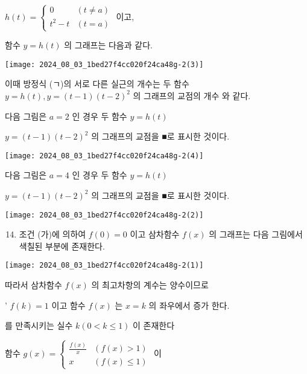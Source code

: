 \documentclass[10pt]{article}
\begin{document}
\(h(t)=\left\{\begin{array}{ll}0 & (t \neq a) \\ t^{2}-t & (t=a)\end{array}\right.\) 이고,

함수 \(y=h(t)\) 의 그래프는 다음과 같다.

\begin{center}
\texttt{[image: 2024\_08\_03\_1bed27f4cc020f24ca48g-2(3)]}
\end{center}

이때 방정식 (ㄱ)의 서로 다른 실근의 개수는 두 함수 \(y=h(t), y=(t-1)(t-2)^{2}\) 의 그래프의 교점의 개수 와 같다.

다음 그림은 \(a=2\) 인 경우 두 함수 \(y=h(t)\)

\(y=(t-1)(t-2)^{2}\) 의 그래프의 교점을 ■로 표시한 것이다.

\begin{center}
\texttt{[image: 2024\_08\_03\_1bed27f4cc020f24ca48g-2(4)]}
\end{center}

다음 그림은 \(a=4\) 인 경우 두 함수 \(y=h(t)\)

\(y=(t-1)(t-2)^{2}\) 의 그래프의 교점을 ■로 표시한 것이다.

\begin{center}
\texttt{[image: 2024\_08\_03\_1bed27f4cc020f24ca48g-2(2)]}
\end{center}

\begin{enumerate}
  \setcounter{enumi}{13}
  \item 조건 (가)에 의하여 \(f(0)=0\) 이고 삼차함수 \(f(x)\) 의 그래프는 다음 그림에서 색칠된 부분에 존재한다.
\end{enumerate}

\begin{center}
\texttt{[image: 2024\_08\_03\_1bed27f4cc020f24ca48g-2(1)]}
\end{center}

따라서 삼차함수 \(f(x)\) 의 최고차항의 계수는 양수이므로

' \(f(k)=1\) 이고 함수 \(f(x)\) 는 \(x=k\) 의 좌우에서 증가 한다.

를 만족시키는 실수 \(k(0<k \leq 1)\) 이 존재한다

함수 \(g(x)=\left\{\begin{array}{ll}\frac{f(x)}{x} & (f(x)>1) \\ x & (f(x) \leq 1)\end{array}\right.\) 이
\end{document}
